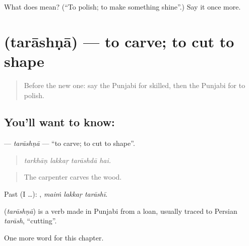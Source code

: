 \begin{tcolorbox}[breakable,colback=teal!4,colframe=teal!35!black,title={Before you move on}]
What does  mean? (\textquotedblleft{}To polish; to make something shine\textquotedblright{}.) Say it once more.
\end{tcolorbox}
\section[\texorpdfstring{\pa{ਤਰਾਸ਼ਣਾ} (tarāshṇā)}{ਤਰਾਸ਼ਣਾ (tarāshṇā)}]{ (tarāshṇā) — to carve; to cut to shape}

\label{lesson:PA-C362-tarashna}



\begin{quote}
Before the new one: say the Punjabi for skilled, then the Punjabi for to polish.
\end{quote}

\subsection*{You'll want to know: }
\textbf{} — \emph{tarāshṇā} — \textquotedblleft{}to carve; to cut to shape\textquotedblright{}.

\begin{quote}
   
\end{quote}

\begin{quote}
\emph{tarkhāṇ lakkaṛ tarāshdā hai.}
\end{quote}

\begin{quote}
The carpenter carves the wood.
\end{quote}

Past (I …):   , \emph{maiṁ lakkaṛ tarāshī}.

\begin{cousinweb}
\textbf{} (\emph{tarāshṇā}) is a verb made in Punjabi from a loan, usually traced to Persian \emph{tarāsh}, \textquotedblleft{}cutting\textquotedblright{}.
\end{cousinweb}

\begin{grammarlens}[title={What you've built}]
One more word for this chapter.
\end{grammarlens}

